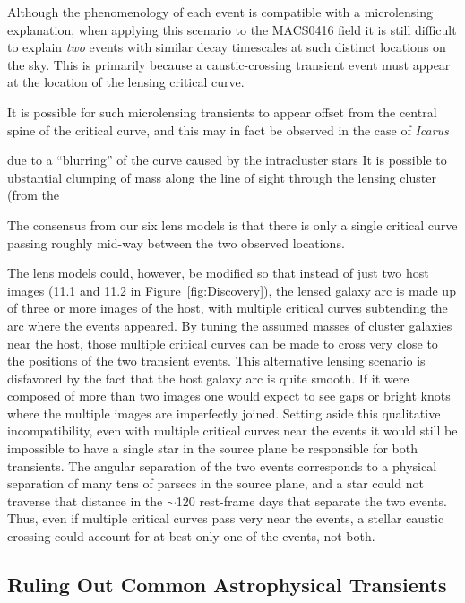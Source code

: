 Although the phenomenology of each \spock event is compatible with a
microlensing explanation, when applying this scenario to the MACS0416
field it is still difficult to explain {\it two} events with similar
decay timescales at such distinct locations on the sky.  This is
primarily because a caustic-crossing transient event must appear at
the location of the lensing critical curve.  

It is possible for such
microlensing transients to appear offset from the central spine of the
critical curve, and this may in fact be observed in the case of {\it Icarus}

due to a ``blurring'' of the curve caused by the intracluster stars 
It is possible to ubstantial clumping of mass along the line of sight through the lensing cluster (from the 

The consensus from our
six lens models is that there is only a single critical curve passing
roughly mid-way between the two observed \spock locations.
 


The lens models could, however, be modified so that instead of just
two host images (11.1 and 11.2 in Figure~\ref{fig:Discovery}), the
lensed galaxy arc is made up of three or more images of the host, with
multiple critical curves subtending the arc where the \spock events
appeared.  By tuning the assumed masses of cluster galaxies near the
\spock host, those multiple critical curves can be made to cross very
close to the positions of the two \spock transient events. This
alternative lensing scenario is disfavored by the fact that the host
galaxy arc is quite smooth. If it were composed of more than two
images one would expect to see gaps or bright knots where the multiple
images are imperfectly joined.  Setting aside this qualitative
incompatibility, even with multiple critical curves near the \spock
events it would still be impossible to have a single star in the
source plane be responsible for both transients. The angular
separation of the two \spock events corresponds to a physical
separation of many tens of parsecs in the source plane, and a star
could not traverse that distance in the $\sim$120 rest-frame days that
separate the two \spock events.  Thus, even if multiple critical
curves pass very near the \spock events, a stellar caustic crossing
could account for at best only one of the \spock events, not both.


\subsection{Ruling Out Common Astrophysical Transients}

